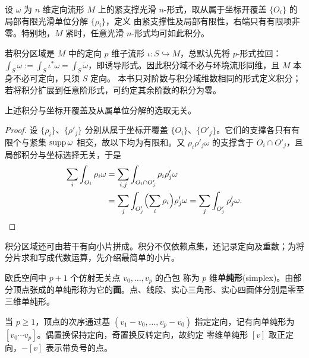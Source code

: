 \begin{definition}
    设 $\omega$ 为 $n$ 维定向流形 $M$ 上的紧支撑光滑 $n$-形式，取从属于坐标开覆盖 $\{O_i\}$ 的局部有限光滑单位分解 $\{\rho_i\}$，定义
    由紧支撑性及局部有限性，右端只有有限项非零。特别地，$M$ 紧时，任意光滑 $n$-形式均可如此积分。
\end{definition}
\begin{remark}
    若积分区域是 $M$ 中的定向 $p$ 维子流形 $\iota:S\hookrightarrow M$，总默认先将 $p$-形式拉回：$\int_S\omega:=\int_S\iota^*\omega=\int_S\tilde\omega$，即诱导形式。因此积分域不必与环境流形同维，且 $M$ 本身不必可定向，只须 $S$ 定向。
    本书只对阶数与积分域维数相同的形式定义积分；若将积分扩展到任意阶形式，可约定其余阶数的积分为零。
\end{remark}
\begin{theorem}
    上述积分与坐标开覆盖及从属单位分解的选取无关。
\end{theorem}
\begin{proof}
    设 $\{\rho_i\}$、$\{\rho'_j\}$ 分别从属于坐标开覆盖 $\{O_i\}$、$\{O'_j\}$。它们的支撑各只有有限个与紧集 $\operatorname{supp}\omega$ 相交，故以下均为有限和。又 $\rho_i\rho'_j\omega$ 的支撑含于 $O_i\cap O'_j$，且局部积分与坐标选择无关，于是
    \begin{align*}
        \sum_i\int_{O_i}\rho_i\omega
        &=\sum_{i,j}\int_{O_i\cap O'_j}\rho_i\rho'_j\omega\\
        &=\sum_j\int_{O'_j}\Bigl(\sum_i\rho_i\Bigr)\rho'_j\omega
        =\sum_j\int_{O'_j}\rho'_j\omega.\qedhere
    \end{align*}
\end{proof}

积分区域还可由若干有向小片拼成。积分不仅依赖点集，还记录定向及重数；为将分片求和写成代数运算，先介绍最简单的小片。

\begin{definition}
    欧氏空间中 $p+1$ 个仿射无关点 $v_0,\ldots,v_p$ 的凸包
    称为 $p$ 维\textbf{单纯形}(simplex)。由部分顶点张成的单纯形称为它的\textbf{面}。点、线段、实心三角形、实心四面体分别是零至三维单纯形。
\end{definition}

当 $p\geqslant1$，顶点的次序通过基 $(v_1-v_0,\ldots,v_p-v_0)$ 指定定向，记有向单纯形为 $[v_0\cdots v_p]$。偶置换保持定向，奇置换反转定向，故约定
零维单纯形 $[v]$ 取正定向，$-[v]$ 表示带负号的点。

